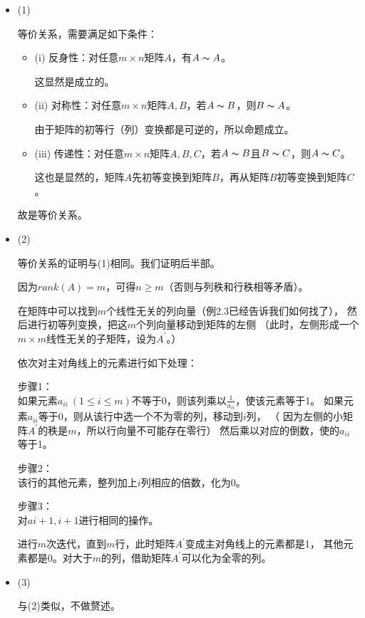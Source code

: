 \documentclass{article}
\begin{document}
\begin{itemize}
  \item (1)

        等价关系，需要满足如下条件：
        \begin{itemize}
          \item (i) 反身性：对任意$m \times n$矩阵$A$，有$A \thicksim A$。

                这显然是成立的。

          \item (ii) 对称性：对任意$m \times n$矩阵$A, B$，若$A \thicksim B$，则$B \thicksim A$。

                由于矩阵的初等行（列）变换都是可逆的，所以命题成立。

          \item (iii) 传递性：对任意$m \times n$矩阵$A, B, C$，若$A \thicksim B$且$B \thicksim C$，则$A \thicksim C$。

                这也是显然的，矩阵$A$先初等变换到矩阵$B$，再从矩阵$B$初等变换到矩阵$C$。
        \end{itemize}
        故是等价关系。

  \item (2)


        等价关系的证明与(1)相同。我们证明后半部。

        因为$rank(A) = m$，可得$n \geq m$（否则与列秩和行秩相等矛盾）。

        在矩阵中可以找到$m$个线性无关的列向量（例2.3已经告诉我们如何找了），
        然后进行初等列变换，把这$m$个列向量移动到矩阵的左侧
        （此时，左侧形成一个$m \times m$线性无关的子矩阵，设为$A^\prime$。）

        依次对主对角线上的元素进行如下处理：

        步骤1：\\
        如果元素$a_{ii} \ (1 \leq i \leq m)$不等于0，则该列乘以$\frac{1}{a_{ii}}$，使该元素等于1。
        如果元素$a_{ii}$等于0，则从该行中选一个不为零的列，移动到$i$列，
        （ 因为左侧的小矩阵$A^\prime$的秩是$m$，所以行向量不可能存在零行）
        然后乘以对应的倒数，使的$a_{ii}$等于1。

        步骤2：\\
        该行的其他元素，整列加上$i$列相应的倍数，化为0。

        步骤3：\\
        对$a{i + 1, i + 1}$进行相同的操作。

        进行$m$次迭代，直到$m$行，此时矩阵$A^\prime$变成主对角线上的元素都是1，
        其他元素都是0。对大于$m$的列，借助矩阵$A^\prime$可以化为全零的列。

  \item (3)

        与(2)类似，不做赘述。

\end{itemize}
\end{document}
